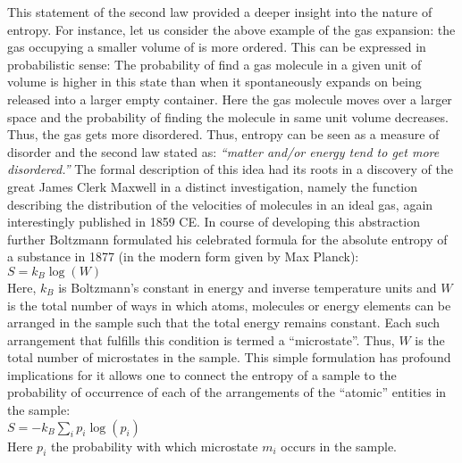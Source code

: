\documentclass[11pt]{article} %
\numberwithin{equation}{section}
\begin{document}
This statement of the second law provided a deeper insight into the nature of entropy. For instance, let us consider the above example of the gas expansion: the gas occupying a smaller volume of is more ordered. This can be expressed in probabilistic sense: The probability of find a gas molecule in a given unit of volume is higher in this state than when it spontaneously expands on being released into a larger empty container. Here the gas molecule moves over a larger space and the probability of finding the molecule in same unit volume decreases. Thus, the gas gets more disordered. Thus, entropy can be seen as a measure of disorder and the second law stated as: \textit{“matter and/or energy tend to get more disordered.”} The formal description of this idea had its roots in a discovery of the great James Clerk Maxwell in a distinct investigation, namely the function describing the distribution of the velocities of molecules in an ideal gas, again interestingly published in 1859 CE. In course of developing this abstraction further Boltzmann formulated his celebrated formula for the absolute entropy of a substance in 1877 (in the modern form given by Max Planck):\\
  $S=k_B\log(W)$\\
Here, $k_B$ is Boltzmann’s constant in energy and inverse temperature units and $W$ is the total number of ways in which atoms, molecules or energy elements can be arranged in the sample such that the total energy remains constant. Each such arrangement that fulfills this condition is termed a “microstate”.  Thus, $W$ is the total number of microstates in the sample. This simple formulation has profound implications for it allows one to connect the entropy of a sample to the probability of occurrence of each of the arrangements of the “atomic” entities in the sample: \\

  $S=-k_B \displaystyle \sum_i p_i \log(p_i)$\\

Here $p_i$ the probability with which microstate $m_i$ occurs in the sample.\\
\end{document}
